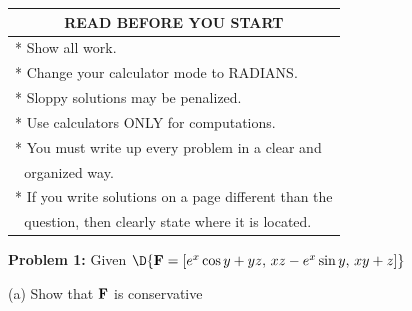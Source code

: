 \documentclass[12pt]{amsart}
\numberwithin{equation}{section}
\begin{document}
\begin{center}
	{\setlength{\extrarowheight}{0.2cm}
	\begin{tabular}{| p{12cm} |}
		\hline
		\multicolumn{1}{|c|}{{\bf READ BEFORE YOU START}} \\
		\hline
		 * Show all work.\\
		 * Change your calculator mode to RADIANS.\\
		 * Sloppy solutions may be penalized.\\
		 * Use calculators ONLY for computations.\\
		 * You must write up every problem in a clear and \\
		 $\,\,$ organized way.\\
		 * If you write solutions on a page different than the \\
		 $\,\,$ question, then clearly state where it is located.\\
		\hline
	\end{tabular}}

\end{center}

\vspace{1.0cm}

\thispagestyle{empty}
\newpage
\thispagestyle{empty}

{\bf Problem 1:} Given $\D{{\bf F} = [e^x\cos y + yz,\, xz - e^x\sin y,\, xy + z]}$

\vspace{0.2cm}

(a) Show that $\text{\bf F}$ is conservative
\end{document}
